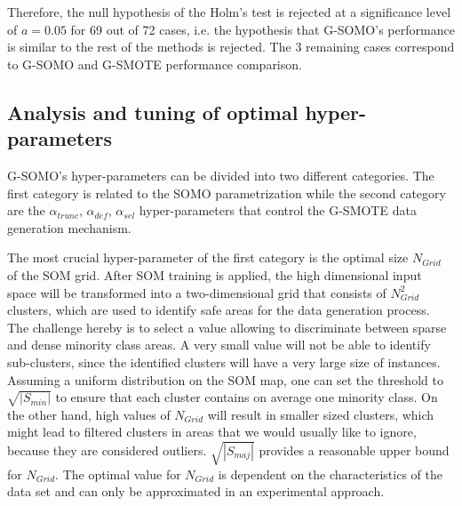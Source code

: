 \documentclass[parskip=full]{scrartcl}
\begin{document}

Therefore, the null hypothesis of the Holm's test is rejected at a significance
level of $a = 0.05$ for 69 out of 72 cases, i.e. the hypothesis that G-SOMO's performance is similar to the rest of the methods is rejected. The 3 remaining cases correspond to G-SOMO and G-SMOTE performance comparison.

\subsection{Analysis and tuning of optimal hyper-parameters}

G-SOMO's hyper-parameters can be divided into two different categories. The first category is related to the SOMO parametrization while the second category are the $\alpha_{trunc}$, $\alpha_{def}$, $\alpha_{sel}$ hyper-parameters that control the G-SMOTE data generation mechanism.

The most crucial hyper-parameter of the first category is the optimal size $N_{Grid}$ of the SOM grid. After SOM training is applied, the high dimensional input space will be transformed into a two-dimensional grid that consists of $N_{Grid}^2$ clusters, which are used to identify safe areas for the data generation process. The challenge hereby is to select a value allowing to discriminate between sparse and dense minority class areas.  A very small value will not be able to identify sub-clusters, since the identified clusters will have a very large size of instances. Assuming a uniform distribution on the SOM map, one can set the threshold to $\sqrt{|S_{min}|}$ to ensure that each cluster contains on average one minority class. On the other hand, high values of $N_{Grid}$ will result in smaller sized clusters, which might lead to filtered clusters in areas that we would usually like to ignore, because they are considered outliers. $\sqrt{|S_{maj}|}$ provides a reasonable upper bound for $N_{Grid}$. The optimal value for $N_{Grid}$ is dependent on the characteristics of the data set and can only be approximated in an experimental approach.
\end{document}

